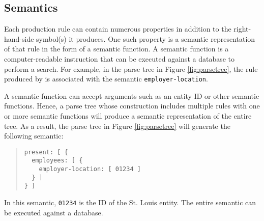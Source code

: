 \documentclass{article}
\begin{document}
\subsection{Semantics}
Each production rule can contain numerous properties in addition to the right-hand-side symbol(s) it produces. One such property is a semantic representation of that rule in the form of a semantic function. A semantic function is a computer-readable instruction that can be executed against a database to perform a search. For example, in the parse tree in Figure \ref{fig:parsetree}, the rule produced by  is associated with the semantic \texttt{employer-location}.

A semantic function can accept arguments such as an entity ID or other semantic functions. Hence, a parse tree whose construction includes multiple rules with one or more semantic functions will produce a semantic representation of the entire tree. As a result, the parse tree in Figure \ref{fig:parsetree} will generate the following semantic:
\begin{quote}
\begin{verbatim}
present: [ {
  employees: [ {
    employer-location: [ 01234 ]
  } ]
} ]
\end{verbatim}
\end{quote}
In this semantic, \texttt{01234} is the ID of the St. Louis \texttt{} entity. The entire semantic can be executed against a database.
\end{document}
